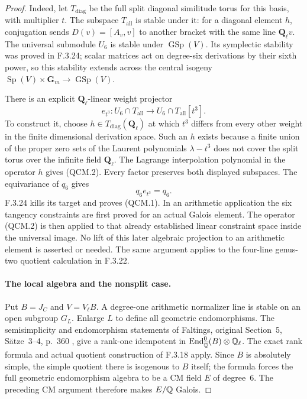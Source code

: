 \begin{proof}
Indeed, let $T_{\mathrm{diag}}$ be the full split diagonal
similitude torus for this basis, with multiplier $t$. The
subspace $T_{\mathrm{all}}$ is stable under it: for a diagonal
element $h$, conjugation sends $D(v)=[A_v,v]$ to another
bracket with the same line $\mathbf Q_\ell v$. The universal
submodule $U_6$ is stable under $\operatorname{GSp}(V)$.
Its symplectic stability was proved in F.3.24; scalar matrices
act on degree-six derivations by their sixth power, so this
stability extends across the central isogeny
$\operatorname{Sp}(V)\times\mathbf G_m\to\operatorname{GSp}(V)$.

There is an explicit $\mathbf Q_\ell$-linear weight projector
\[
 e_{t^3}:U_6\cap T_{\mathrm{all}}
       \longrightarrow U_6\cap T_{\mathrm{all}}[t^3].          \tag{QCM.2}
\]
To construct it, choose $h\in T_{\mathrm{diag}}(\mathbf Q_\ell)$
at which $t^3$ differs from every other weight in the finite
dimensional derivation space. Such an $h$ exists because a
finite union of the proper zero sets of the Laurent
polynomials $\lambda-t^3$ does not cover the split torus
over the infinite field $\mathbf Q_\ell$. The Lagrange
interpolation polynomial in the operator $h$ gives (QCM.2).
Every factor preserves both displayed subspaces. The
equivariance of $q_6$ gives
\[
                              q_6 e_{t^3}=q_6.
\]
F.3.24 kills its target and proves (QCM.1).
In an arithmetic application the six tangency constraints
are first proved for an actual Galois element. The operator
(QCM.2) is then applied to that already established linear
constraint space inside the universal image. No lift of
this later algebraic projection to an arithmetic element
is asserted or needed. The same argument applies to the
four-line genus-two quotient calculation in F.3.22.



\paragraph{The local algebra and the nonsplit case.}
Put $B=J_C$ and $V=V_\ell B$. A degree-one arithmetic
normalizer line is stable on an open subgroup $G_L$.
Enlarge $L$ to define all geometric endomorphisms.
The semisimplicity and endomorphism statements of
Faltings, original Section~5, S\"atze~3--4, p.~360
\cite{GenFaltings1983}, give a rank-one idempotent
in $\operatorname{End}^0_{\overline{\mathbb Q}}(B)\otimes\mathbb Q_\ell$.
The exact rank formula and actual quotient construction
of F.3.18 apply. Since $B$ is absolutely simple, the
simple quotient there is isogenous to $B$ itself;
the formula forces the full geometric endomorphism
algebra to be a CM field $E$ of degree~6. The preceding
CM argument therefore makes $E/\mathbb Q$ Galois.


\end{proof}
